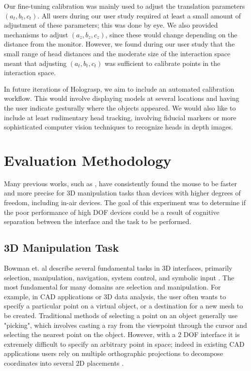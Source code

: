 \documentclass[pageno]{jpaper}
\begin{document}
Our fine-tuning calibration was mainly used to adjust the translation parameters $(a_t, b_t, c_t)$. All users during our user study required at least
a small amount of adjustment of these parameters; this was done by eye. We also provided mechanisms to adjust
$(a_z, b_z, c_z)$, since these would change depending on the distance from the monitor. However, we found during our user study that the small range of
head distances and the moderate size of the interaction space meant that adjusting $(a_t, b _t, c_t)$ was sufficient to calibrate points in the
interaction space.

In future iterations of Holograsp, we aim to include an automated calibration workflow. This would involve displaying models at several locations and
having the user indicate gesturally where the objects appeared. We would also like to include at least rudimentary head tracking, involving fiducial
markers or more sophisticated computer vision techniques to recognize heads in depth images.

\section{Evaluation Methodology}
Many previous works, such as \cite{study1,mattheiss2011navigating,study2}, have consistently found the
mouse to be faster and more precise for 3D manipulation
tasks than devices with higher degrees of freedom, including in-air devices. 
The goal of this experiment was to determine if the poor performance of high DOF devices could
be a result of cognitive separation between the interface and the task to be performed.
\subsection{3D Manipulation Task}
Bowman et. al describe several fundamental tasks in 3D interfaces, primarily selection,
manipulation, navigation, system control, and symbolic input \cite{3dui}. The most fundamental
for many domains are selection and manipulation. For example, in CAD applications or 3D data
analysis, the user often wants to specify a particular point on a virtual object, or a 
destination for a new mesh to be created. Traditional methods of selecting a point on an
object generally use "picking", which involves casting a ray from the viewpoint through the 
cursor and selecting the nearest point on the object\cite{study1}. However, with a 2 DOF
interface it is extremely difficult to specify an arbitrary point in space; indeed in existing 
CAD applications users rely on multiple orthographic projections to decompose coordinates into
several 2D placements \cite{study2}.
\end{document}
